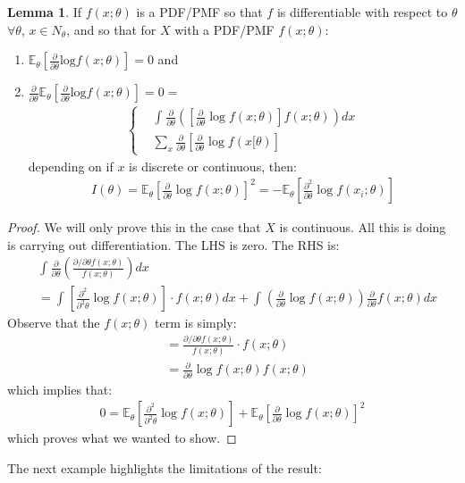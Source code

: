 \documentclass[11pt]{scrartcl}
\theoremstyle{definition}
\newtheorem{lemma}[theorem]{Lemma}
\theoremstyle{remark}
\newcommand{\EXth}[1]{\mathbb{E}_\theta \left[ #1 \right]}
\newcommand{\idx}[2]{\int_{#1}^{#2}}
\begin{document}
\begin{lemma}
	If $f(x; \theta)$ is a PDF/PMF so that $f$ is differentiable with respect to $\theta$ $\forall \theta$, $x \in N_\theta$, and so that for $X$ with a PDF/PMF $f(x; \theta)$: 
	\begin{enumerate}[noitemsep]
		\item $\EXth{\frac{\partial}{\partial \theta} \text{log}f(x; \theta)} =0$ and 
		\item $\frac{\partial}{\partial \theta} \EXth{\frac{\partial}{\partial \theta} \text{log}f(x; \theta) } = 0 = $ 
		\begin{align*}
			\begin{cases}
				& \idx{}{} \frac{\partial}{\partial \theta} \left( \left[  \frac{\partial}{\partial \theta} \log f(x; \theta)   \right]	f(x; \theta) 	\right) dx \\
				& \sum_{x} \frac{\partial}{\partial \theta} \left[ \frac{\partial}{\partial \theta} \log f(x[ \theta) \right] 
			\end{cases}	
		\end{align*}
			depending on if $x$ is discrete or continuous, then: 
			\begin{align*}
				I(\theta) = \EXth{\frac{\partial}{\partial \theta} \log f(x; \theta)}^2	= - \EXth{\frac{\partial^2}{\partial \theta} \log f(x_i; \theta)}
			\end{align*}
	\end{enumerate}
\end{lemma}

\begin{proof}
	We will only prove this in the case that $X$ is continuous. All this is doing is carrying out differentiation. The LHS is zero. The RHS is: 
	\begin{align*}
		& \idx{}{} \frac{\partial}{\partial \theta} \left( 	\frac{\partial / \partial \theta f(x; \theta) }{f(x; \theta)}		\right) dx  	\\
		& = \idx{}{} \left[ 	\frac{\partial^2}{\partial^2 \theta}	 \log f(x; \theta)	\right] \cdot f(x; \theta) dx + \idx{}{}  \left( \frac{\partial}{\partial \theta} \log f(x; \theta) \right) \frac{\partial}{\partial \theta} f(x; \theta) dx 
	\end{align*}
	Observe that the $f(x; \theta)$ term is simply: 
	\begin{align*}
		& = \frac{\partial / \partial \theta f(x; \theta)}{f(x; \theta)} \cdot f(x; \theta) \\
		& = \frac{\partial}{\partial \theta} \log f(x; \theta) f(x; \theta) 
	\end{align*}
	which implies that: 
	\begin{align*}
		0 = \EXth{\frac{\partial^2}{\partial^2 \theta} \log f(x; \theta)} + \EXth{\frac{\partial}{\partial \theta} \log f(x; \theta)}^2 
	\end{align*}
	which proves what we wanted to show. 
\end{proof}
The next example highlights the limitations of the result: 
\end{document}
